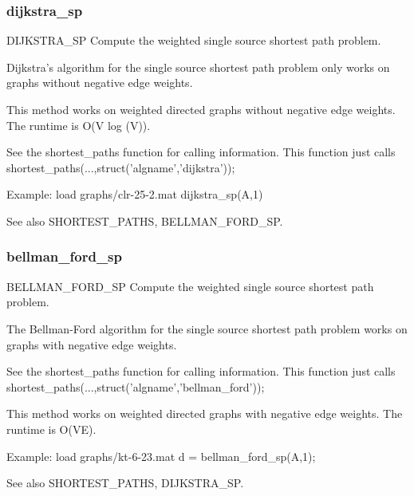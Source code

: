 \subsubsection*{dijkstra\_sp}
\begin{mcode}
  DIJKSTRA_SP Compute the weighted single source shortest path problem.
 
  Dijkstra's algorithm for the single source shortest path problem only
  works on graphs without negative edge weights.
 
  This method works on weighted directed graphs without negative edge
  weights.
  The runtime is O(V log (V)).
 
  See the shortest_paths function for calling information.  This function 
  just calls shortest_paths(...,struct('algname','dijkstra'));
 
  Example:
     load graphs/clr-25-2.mat
     dijkstra_sp(A,1)
 
  See also SHORTEST_PATHS, BELLMAN_FORD_SP.
\end{mcode}
\newpage
\subsubsection*{bellman\_ford\_sp}
\begin{mcode}
  BELLMAN_FORD_SP Compute the weighted single source shortest path problem.
 
  The Bellman-Ford algorithm for the single source shortest path problem
  works on graphs with negative edge weights.  
 
  See the shortest_paths function for calling information.  This function 
  just calls shortest_paths(...,struct('algname','bellman_ford'));
 
  This method works on weighted directed graphs with negative edge weights.
  The runtime is O(VE).
 
  Example:
     load graphs/kt-6-23.mat
     d = bellman_ford_sp(A,1);
 
  See also SHORTEST_PATHS, DIJKSTRA_SP.
\end{mcode}
\newpage
